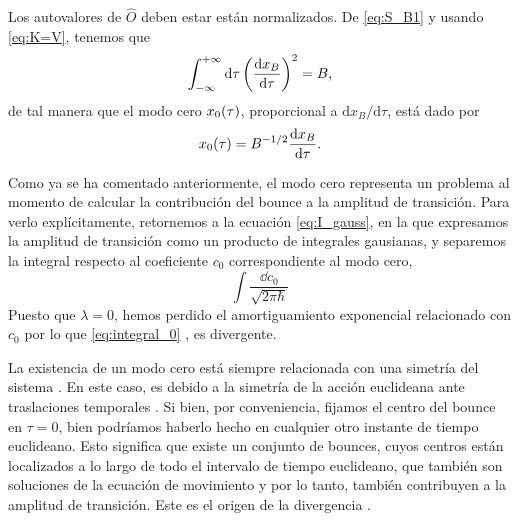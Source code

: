 Los autovalores de $\hat{O}$ deben estar están normalizados. De \eqref{eq:S_B1} y usando \eqref{eq:K=V}, tenemos que
\begin{equation}
	\int_{-\infty}^{+\infty} \dd{\tau} \qty(\dv{x_B}{\tau})^2 = B,
\end{equation}
de tal manera que el modo cero $x_0\qty(\tau)$, proporcional a $\text{d}x_B/\text{d}\tau$, está dado por %
\begin{equation}
	x_0(\tau) = B^{-1/2} \dv{x_B}{\tau}.
\end{equation}

Como ya se ha comentado anteriormente, el modo cero representa un problema al momento de calcular la contribución del bounce a la amplitud de transición. Para verlo explícitamente, retornemos a la ecuación \eqref{eq:I_gauss}, en la que expresamos la amplitud de transición como un producto de integrales gausianas, y separemos la integral respecto al coeficiente $c_0$ correspondiente al modo cero, 
\begin{equation} \label{eq:integral_0}
	\int \frac{\dd{c_0}}{\sqrt{2\pi \hbar}} 
\end{equation}
Puesto que $\lambda = 0$, hemos perdido el amortiguamiento exponencial relacionado con $c_0$ por lo que \eqref{eq:integral_0}
, es divergente. 

La existencia de un modo cero está siempre relacionada con una simetría del sistema \cite{das2006field}. 
En este caso, es debido a la simetría de la acción euclideana ante traslaciones temporales \cite{callan1977fate}. Si bien, por conveniencia, fijamos el centro del bounce en $\tau = 0$, bien podríamos haberlo hecho en cualquier otro instante de tiempo euclideano. Esto significa que existe un conjunto de bounces, cuyos centros están localizados a lo largo de todo el intervalo de tiempo euclideano, que también son soluciones de la ecuación de movimiento y por lo tanto, también contribuyen a la amplitud de transición. Este es el origen de la divergencia 
\cite{kleinert2009path}.

